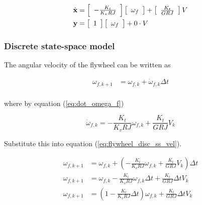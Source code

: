 \begin{align}
  \dot{\mathbf{x}} &= \left[
  \begin{array}{c}
    -\frac{K_t}{K_v RJ}
  \end{array}
  \right] \left[
  \begin{array}{c}
    \omega_f \\
  \end{array}
  \right] + \left[
  \begin{array}{c}
    \frac{K_t}{GRJ}
  \end{array}
  \right] V \\
  \mathbf{y} &= \left[
  \begin{array}{c}
    1
  \end{array}
  \right] \left[
  \begin{array}{c}
    \omega_f \\
  \end{array}
  \right] + 0 \cdot V
\end{align}

\subsubsection{Discrete state-space model}

The angular velocity of the flywheel can be written as

\begin{align}
  \omega_{f,k+1} &= \omega_{f,k} + \dot{\omega}_{f,k} \Delta t
    \label{eq:flywheel_disc_ss_vel} \\
\end{align}

where by equation (\ref{eq:dot_omega_f})

\begin{equation*}
  \dot{\omega}_{f,k} = -\frac{K_t}{K_v RJ} \omega_{f,k} + \frac{K_t}{GRJ} V_k
\end{equation*}

Substitute this into equation (\ref{eq:flywheel_disc_ss_vel}).

\begin{align}
  \omega_{f,k+1} &= \omega_{f,k} + \left(-\frac{K_t}{K_v RJ} \omega_{f,k} +
    \frac{K_t}{GRJ} V_k\right) \Delta t \nonumber \\
  \omega_{f,k+1} &= \omega_{f,k} - \frac{K_t}{K_v RJ} \omega_{f,k} \Delta t +
    \frac{K_t}{GRJ} \Delta t V_k \nonumber \\
  \omega_{f,k+1} &= \left(1 - \frac{K_t}{K_v RJ} \Delta t\right) \omega_{f,k} +
    \frac{K_t}{GRJ} \Delta t V_k \nonumber \\
\end{align}

